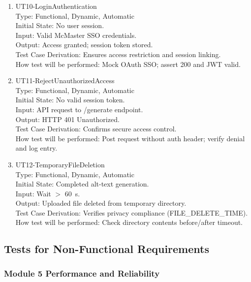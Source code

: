 \documentclass[12pt, titlepage]{article}
\begin{document}
\begin{enumerate}
\item{UT10-LoginAuthentication\\}
Type: Functional, Dynamic, Automatic\\
Initial State: No user session.\\
Input: Valid McMaster SSO credentials.\\
Output: Access granted; session token stored.\\
Test Case Derivation: Ensures access restriction and session linking.\\
How test will be performed: Mock OAuth SSO; assert 200 and JWT valid.

\item{UT11-RejectUnauthorizedAccess\\}
Type: Functional, Dynamic, Automatic\\
Initial State: No valid session token.\\
Input: API request to /generate endpoint.\\
Output: HTTP 401 Unauthorized.\\
Test Case Derivation: Confirms secure access control.\\
How test will be performed: Post request without auth header; verify denial and log entry.

\item{UT12-TemporaryFileDeletion\\}
Type: Functional, Dynamic, Automatic\\
Initial State: Completed alt-text generation.\\
Input: Wait $>$ 60~s.\\
Output: Uploaded file deleted from temporary directory.\\
Test Case Derivation: Verifies privacy compliance (FILE\_DELETE\_TIME).\\
How test will be performed: Check directory contents before/after timeout.
\end{enumerate}

\subsection{Tests for Non-Functional Requirements}

\subsubsection{Module 5 \textemdash{} Performance and Reliability}
\end{document}
